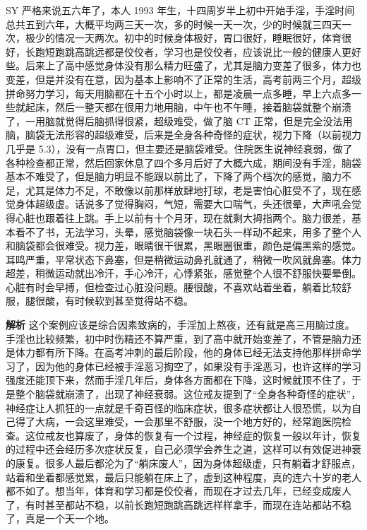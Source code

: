 \begin{case}[神经衰弱]
    SY 严格来说五六年了，本人 1993 年生，十四周岁半上初中开始手淫，手淫时间总共五到六年，大概平均两三天一次，多的时候一天一次，少的时候就三四天一次，极少的情况一天两次。初中的时候身体极好，胃口很好，睡眠很好，体育很好，长跑短跑跳高跳远都是佼佼者，学习也是佼佼者，应该说比一般的健康人更好些。后来上了高中感觉身体没有那么精力旺盛了，尤其是脑力变差了很多，体力也变差，但是并没有在意，因为基本上影响不了正常的生活，高考前两三个月，超级拼命努力学习，每天用脑都在十五个小时以上，都是凌晨一点多睡，早上六点多一些就起床，然后一整天都在很用力地用脑，中午也不午睡，接着脑袋就整个崩溃了，一用脑就觉得后脑抓得很紧，超级难受，做了脑 CT 正常，但是完全没法用脑，脑袋无法形容的超级难受，后来是全身各种奇怪的症状，视力下降（以前视力几乎是 5.3），没有一点胃口，但主要还是脑袋难受。住院医生说神经衰弱，做了各种检查都正常，然后回家休息了四个多月后好了大概六成，期间没有手淫，脑袋基本不难受了，但是脑力明显不能跟以前比了，下降了两个档次的感觉，脑力不足，尤其是体力不足，不敢像以前那样放肆地打球，老是害怕心脏受不了，现在感觉身体超级虚。话说多了觉得胸闷，气短，需要大口喘气，头还很晕，大声吼会觉得心脏也跟着往上跳。手上以前有十个月牙，现在就剩大拇指两个。脑力很差，基本看不了书，无法学习，头晕，感觉脑袋像一块石头一样动不起来，用多了整个人和脑袋都会很难受。视力差，眼睛很干很累，黑眼圈很重，颜色是偏黑紫的感觉。耳鸣严重，平常状态下鼻塞，但是稍微运动鼻孔就通了，稍微一吹风就鼻塞。体力超差，稍微运动就出冷汗，手心冷汗，心悸紧张，感觉整个人很不舒服快要晕倒。心脏有时会早搏，但检查过心脏没问题。腰很酸，不喜欢站着坐着，躺着比较舒服，腿很酸，有时候软到甚至觉得站不稳。

    \textbf{解析} 这个案例应该是综合因素致病的，手淫加上熬夜，还有就是高三用脑过度。手淫也比较频繁，初中时伤精还不算严重，到了高中就开始变差了，不管是脑力还是体力都有所下降。在高考冲刺的最后阶段，他的身体已经无法支持他那样拼命学习了，因为他的身体已经被手淫恶习掏空了，如果没有手淫恶习，也许这样的学习强度还能顶下来，然而手淫几年后，身体各方面都在下降，这时候就顶不住了，于是整个脑袋就崩溃了，出现了神经衰弱。这位戒友提到了“全身各种奇怪的症状”，神经症让人抓狂的一点就是千奇百怪的临床症状，很多症状都让人很恐慌，以为自己得了大病，一会这里难受，一会那里不舒服，没一个地方好的，经常跑医院检查。这位戒友也算废了，身体的恢复有一个过程，神经症的恢复一般以年计，恢复的过程中还会经历多次症状反复，自己必须学会养生之道，这样可以有效促进神衰的康复。很多人最后都沦为了“躺床废人”，因为身体超级虚，只有躺着才舒服点，站着和坐着都感觉累，最后只能躺在床上了，虚到这种程度，真的连六十岁的老人都不如了。想当年，体育和学习都是佼佼者，而现在才过去几年，已经变成废人了，有时甚至都站不稳，以前长跑短跑跳高跳远样样拿手，而现在连站都站不稳了，真是一个天一个地。
\end{case}


